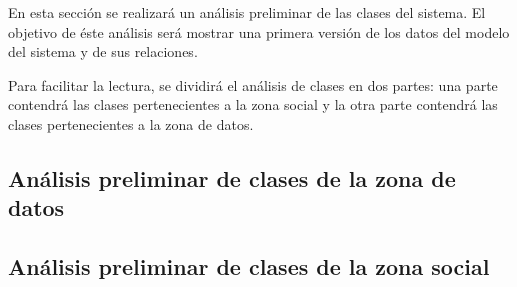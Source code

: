En esta sección se realizará un análisis preliminar de las clases del sistema.  El objetivo de éste análisis será mostrar una primera versión de los datos del modelo del sistema y de sus relaciones.

Para facilitar la lectura, se dividirá el análisis de clases en dos partes: una parte contendrá las clases pertenecientes a la zona social y la otra parte contendrá las clases pertenecientes a la zona de datos.


\subsection{Análisis preliminar de clases de la zona de datos}
\label{clases_preliminares_modelo_datos}


\subsection{Análisis preliminar de clases de la zona social}
\label{clases_preliminares_modelo_debate}
